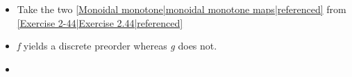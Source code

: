 \begin{itemize}
    \item Take the two \ref{Monoidal monotone|monoidal monotone maps|referenced} from \ref{Exercise 2-44|Exercise 2.44|referenced}
    \item \emph{f} yields a discrete preorder whereas \emph{g} does not.
    \item {}
  \end{itemize}
